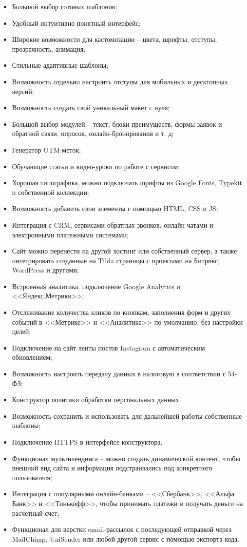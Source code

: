\begin{itemize}
	\item	Большой выбор готовых шаблонов;
	\item	Удобный интуитивно понятный интерфейс;
	\item	Широкие возможности для кастомизации -- цвета, шрифты, отступы, прозрачность, анимация;
	\item	Стильные адаптивные шаблоны;
	\item	Возможность отдельно настроить отступы для мобильных и десктопных версий;
	\item	Возможность создать свой уникальный макет с нуля;
	\item	Большой выбор модулей -- текст, блоки преимуществ, формы заявок и обратной связи, опросов, онлайн-бронирования и т. д;
	\item	Генератор UTM-меток;
	\item	Обучающие статьи и видео-уроки по работе с сервисом;
	\item	Хорошая типографика, можно подключать шрифты из Google Fonts, Typekit и собственной коллекции;
	\item	Возможность добавить свои элементы с помощью HTML, CSS и JS;
	\item	Интеграция с CRM, сервисами обратных звонков, онлайн-чатами и электронными платежными системами;
	\item	Сайт можно перенести на другой хостинг или собственный сервер, а также интегрировать созданные на Tilda страницы с проектами на Битрикс, WordPress и другими;
	\item	Встроенная аналитика, подключение Google Analytics и <<Яндекс.Метрики>>;
	\item	Отслеживание количества кликов по кнопкам, заполнения форм и других событий в <<Метрике>> и <<Аналитике>> по умолчанию, без настройки целей;
	\item	Подключение на сайт ленты постов Instagram с автоматическим обновлением;
	\item	Возможность настроить передачу данных в налоговую в соответствии с 54-ФЗ;
	\item	Конструктор политики обработки персональных данных.
	\item	Возможность сохранить и использовать для дальнейшей работы собственные шаблоны;
	\item	Подключение HTTPS в интерфейсе конструктора.
	\item	Функционал мультилендинга -- можно создать динамический контент, чтобы внешний вид сайта и информация подстраивались под конкретного пользователя;
	\item	Интеграция с популярными онлайн-банками -- <<Сбербанк>>, <<Альфа Банк>> и <<Тинькофф>>, чтобы принимать платежи и получать деньги на расчетный счет;
	\item	Функционал для верстки email-рассылок с последующей отправкой через MailChimp, UniSender или любой другой сервис с помощью экспорта кода.
\end{itemize}

